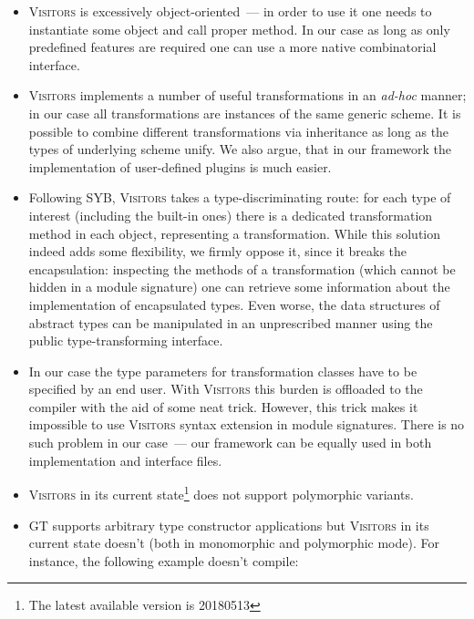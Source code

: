 \begin{itemize}
   \item \textsc{Visitors} is excessively object-oriented~--- in order to use it one needs to instantiate some object and call proper method. In our case as long as
     only predefined features are required one can use a more native combinatorial interface.
     
   \item \textsc{Visitors} implements a number of useful transformations in an \emph{ad-hoc} manner; in our case all transformations are instances of the
     same generic scheme. It is possible to combine different transformations via inheritance as long as the types of underlying scheme unify. We also argue, that
     in our framework the implementation of user-defined plugins is much easier.
     
   \item Following SYB, \textsc{Visitors} takes a type-discriminating route: for each type of interest (including the built-in ones) there is a dedicated
     transformation method in each object, representing a transformation. While this solution indeed adds some flexibility, we firmly oppose it, since it
     breaks the encapsulation: inspecting the methods of a transformation (which cannot be hidden in a module signature) one can retrieve some
     information about the implementation of encapsulated types. Even worse, the data structures of abstract types can be manipulated in an unprescribed
     manner using the public type-transforming interface.

   \item In our case the type parameters for transformation classes have to be specified by an end user. With \textsc{Visitors} this burden is offloaded to the
     compiler with the aid of some neat trick. However, this trick makes it impossible to use \textsc{Visitors} syntax extension in module signatures. There is no
     such problem in our case~--- our framework can be equally used in both implementation and interface files.

   \item \textsc{Visitors} in its current state\footnote{The latest available version is 20180513} does not support polymorphic variants.
   
   \item \textsc{GT} supports arbitrary type constructor applications but \textsc{Visitors} in its current state doesn't (both in monomorphic and polymorphic mode).
     For instance, the following example doesn't compile:
     

\end{itemize}
